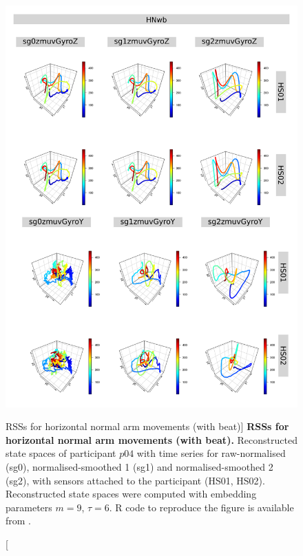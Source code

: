 


\begin{figure}
\centering
\includegraphics[height=0.8\textheight]{rss_HNwb_p04}
\caption
	[RSSs for horizontal normal arm movements (with beat)]{
	{\bf RSSs for horizontal normal arm movements (with beat).}
	Reconstructed state spaces of participant $p04$
	with time series for raw-normalised (sg0), 
	normalised-smoothed 1 (sg1) and 
	normalised-smoothed 2 (sg2), 
	with sensors attached to the participant (HS01, HS02).
	Reconstructed state spaces were computed with 
	embedding parameters $m=9$, $\tau=6$.
	R code to reproduce the figure is available from \cite{xochicale2018}.
        }
     \label{fig:rss_HNwb_p04}
\end{figure}






